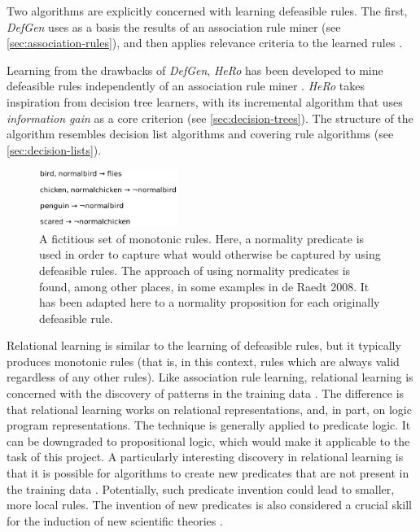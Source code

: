 Two algorithms are explicitly concerned with learning defeasible rules. The first, \textit{DefGen} uses as a basis the results of an association rule miner (see \autoref{sec:association-rules}), and then applies relevance criteria to the learned rules \cite{governatoriApplicationAssociationRules2001}.

Learning from the drawbacks of \textit{DefGen}, \textit{HeRo} has been developed to mine defeasible rules independently of an association rule miner \cite{johnstonAlgorithmInductionDefeasible2003}. \textit{HeRo} takes inspiration from decision tree learners, with its incremental algorithm that uses \textit{information gain} as a core criterion (see \autoref{sec:decision-trees}). The structure of the algorithm resembles decision list algorithms and covering rule algorithms (see \autoref{sec:decision-lists}).


\begin{figure}[htb]
        \centering
        \includegraphics[width=0.4\textwidth]{images/monotonic-theory.png}
        \caption{A fictitious set of monotonic rules. Here, a normality predicate is used in order to capture what would otherwise be captured by using defeasible rules. The approach of using normality predicates is found, among other places, in some examples in de Raedt 2008. It has been adapted here to a normality proposition for each originally defeasible rule.}
        \label{fig:relational}
\end{figure}

Relational learning is similar to the learning of defeasible rules, but it typically produces monotonic rules (that is, in this context, rules which are always valid regardless of any other rules). Like association rule learning, relational learning is concerned with the discovery of patterns in the training data \citep{deraedtLogicalRelationalLearning2008}. The difference is that relational learning works on relational representations, and, in part, on logic program representations. The technique is generally applied to predicate logic. It can be downgraded to propositional logic, which would make it applicable to the task of this project. A particularly interesting discovery in relational learning is that it is possible for algorithms to create new predicates that are not present in the training data \citep[p.~797f.]{russellArtificialIntelligenceModern2010}. Potentially, such predicate invention could lead to smaller, more local rules. The invention of new predicates is also considered a crucial skill for the induction of new scientific theories \citep[p.~797f.]{russellArtificialIntelligenceModern2010}.

